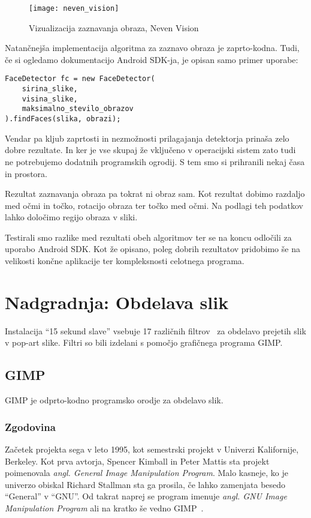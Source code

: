 \begin{figure}[!ht]
    \centering
    \texttt{[image: neven\_vision]}
    \caption{Vizualizacija zaznavanja obraza, Neven Vision}
    \label{fig:neven_vision}
\end{figure}

Natančnejša implementacija algoritma za zaznavo obraza je zaprto-kodna. Tudi,
če si ogledamo dokumentacijo Android SDK-ja, je opisan samo primer uporabe:
\begin{lstlisting}[caption="Primer uporabe zaznavanja obraza z orodjem Android SDK"]
FaceDetector fc = new FaceDetector(
    sirina_slike,
    visina_slike,
    maksimalno_stevilo_obrazov
).findFaces(slika, obrazi);
\end{lstlisting}

Vendar pa kljub zaprtosti in nezmožnosti prilagajanja detektorja prinaša zelo
dobre rezultate. In ker je vse skupaj že vključeno v operacijski sistem zato
tudi ne potrebujemo dodatnih programskih ogrodij. S tem smo si prihranili
nekaj časa in prostora.

Rezultat zaznavanja obraza pa tokrat ni obraz sam. Kot rezultat dobimo
razdaljo med očmi in točko, rotacijo obraza ter točko med očmi. Na podlagi teh
podatkov lahko določimo regijo obraza v sliki.

Testirali smo razlike med rezultati obeh algoritmov ter se na koncu odločili
za uporabo Android SDK. Kot že opisano, poleg dobrih rezultatov pridobimo še
na velikosti končne aplikacije ter kompleksnosti celotnega programa.


\chapter{Nadgradnja: Obdelava slik}
\label{ch:obdelavaSlik}
Instalacija ``15 sekund slave'' vsebuje 17 različnih
filtrov~\cite[Poglavje~5]{thesisSamoJuvan} za obdelavo prejetih slik v
pop-art slike. Filtri so bili izdelani s pomočjo grafičnega programa GIMP.


\section{GIMP}
GIMP je odprto-kodno programsko orodje za obdelavo slik.


\subsection{Zgodovina}
Začetek projekta sega v leto 1995, kot semestrski projekt v Univerzi
Kalifornije, Berkeley. Kot prva avtorja, Spencer Kimball in Peter Mattis sta
projekt poimenovala \textit{angl. General Image Manipulation Program}. Malo
kasneje, ko je univerzo obiskal Richard Stallman sta ga prosila, če lahko
zamenjata besedo ``General'' v ``GNU''. Od takrat naprej se program imenuje
\textit{angl. GNU Image Manipulation Program} ali na kratko še vedno
GIMP~\cite{wiki:GIMP}.



